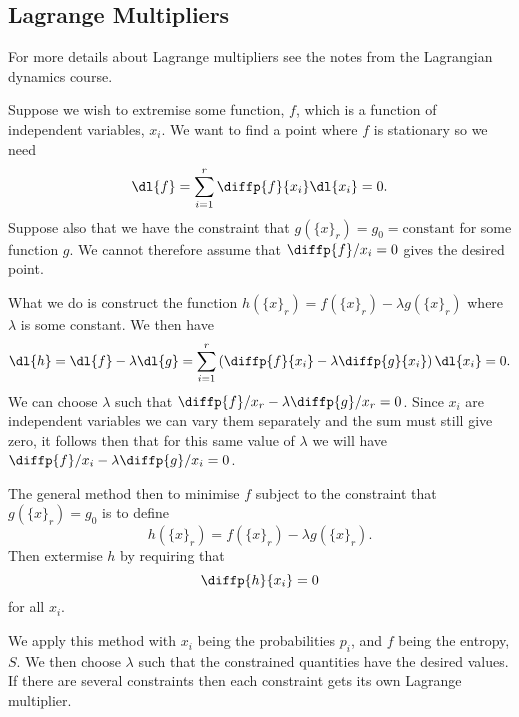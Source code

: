 \documentclass[fleqn]{NotesClass}
\begin{document}
    \subsection{Lagrange Multipliers}
    \begin{rmk}
        For more details about Lagrange multipliers see the notes from the Lagrangian dynamics course.
    \end{rmk}
    Suppose we wish to extremise some function, \(f\), which is a function of independent variables, \(x_i\).
    We want to find a point where \(f\) is stationary so we need
    \begin{equation}
        \dl{f} = \sum_{i=1}^{r} \diffp{f}{x_i}\dl{x_i} = 0.
    \end{equation}
    Suppose also that we have the constraint that \(g(\{x\}_r) = g_0 = \text{constant}\) for some function \(g\).
    We cannot therefore assume that \(\diffp{f}/{x_i} = 0\) gives the desired point.
    
    What we do is construct the function \(h(\{x\}_r) = f(\{x\}_r) - \lambda g(\{x\}_r)\) where \(\lambda\) is some constant.
    We then have
    \begin{equation}
        \dl{h} = \dl{f} - \lambda\dl{g} = \sum_{i=1}^{r} \left( \diffp{f}{x_i} - \lambda\diffp{g}{x_i}  \right)\dl{x_i} = 0.
    \end{equation}
    We can choose \(\lambda\) such that \(\diffp{f}/{x_r} - \lambda \diffp{g}/{x_r} = 0\).
    Since \(x_i\) are independent variables we can vary them separately and the sum must still give zero, it follows then that for this same value of \(\lambda\) we will have \(\diffp{f}/{x_i} - \lambda \diffp{g}/{x_i} = 0\).
    
    The general method then to minimise \(f\) subject to the constraint that \(g(\{x\}_r) = g_0\) is to define
    \begin{equation}
        h(\{x\}_r) = f(\{x\}_r) - \lambda g(\{x\}_r).
    \end{equation}
    Then extermise \(h\) by requiring that
    \begin{equation}
        \diffp{h}{x_i} = 0
    \end{equation}
    for all \(x_i\).
    
    We apply this method with \(x_i\) being the probabilities \(p_i\), and \(f\) being the entropy, \(S\).
    We then choose \(\lambda\) such that the constrained quantities have the desired values.
    If there are several constraints then each constraint gets its own Lagrange multiplier.
    
\end{document}
